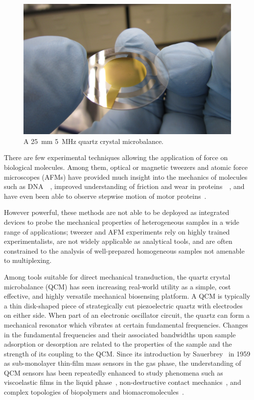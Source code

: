 \begin{figure}[ht]
 \centering
 \includegraphics[keepaspectratio,width=12cm]{qcm/figures/qcm_holding.jpg}
 \caption{A \SI{25}{\milli\meter} \SI{5}{\mega\hertz} quartz crystal microbalance.}
\label{fig:qcmholding}
\end{figure}
There are few experimental techniques allowing the application of force
on biological molecules. Among them, optical or magnetic tweezers and
atomic force microscopes (AFMs) have provided much insight into the
mechanics of molecules such as
DNA~\cite{cui2000pulling}~\cite{marko1995stretching}, improved
understanding of friction and wear in
proteins~\cite{suda2001origin}~\cite{bormuth2009protein}, and have even
been able to observe stepwise motion of motor
proteins~\cite{asbury2003kinesin}.

However powerful, these methods are not able to be deployed as integrated
devices to probe the mechanical properties of heterogeneous samples in a
wide range of applications; tweezer and AFM experiments rely on highly
trained experimentalists, are not widely applicable as analytical tools,
and are often constrained to the analysis of well-prepared homogeneous
samples not amenable to multiplexing.

Among tools suitable for direct mechanical transduction, the quartz crystal
microbalance (QCM) has seen increasing real-world utility as a simple, cost
effective, and highly versatile mechanical biosensing platform. A QCM is
typically a thin disk-shaped piece of strategically cut piezoelectric
quartz with electrodes on either side. When part of an electronic
oscillator circuit, the quartz can form a mechanical resonator which
vibrates at certain fundamental frequencies. Changes in the fundamental
frequencies and their associated bandwidths upon sample adsorption or
desorption are related to the properties of the sample and the strength of
its coupling to the QCM\@. Since its introduction by
Sauerbrey~\cite{sauerbrey1959verwendung} in 1959 as sub-monolayer thin-film
mass sensors in the gas phase, the understanding of QCM sensors has been
repeatedly enhanced to study phenomena such as viscoelastic films in the
liquid phase~\cite{kanazawa1985frequency}, non-destructive contact
mechanics~\cite{johannsman2007contacts}, and complex topologies of
biopolymers and biomacromolecules~\cite{marx2003quartz}.

